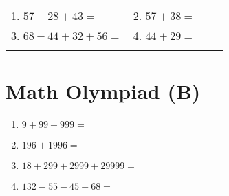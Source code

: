 \documentclass[a4paper,12pt]{article}
\begin{document}
\noindent
\begin{tabularx}{\textwidth}{lX lX}
    \vspace{8cm}
    1. \textbf{\Large $57 + 28 + 43 =$} \underline{\hspace{2cm}} \hspace{3.1cm} & 2. \textbf{\Large $57 + 38 =$} \underline{\hspace{2cm}} \\ 
    \vspace{8cm}
    3. \textbf{\Large $68 + 44 + 32 + 56 =$} \underline{\hspace{2cm}} & 4. \textbf{\Large $44 + 29 =$} \underline{\hspace{2cm}} \\
    \vspace{4cm}
\end{tabularx}


\newpage
\section*{\huge \center\textbf{Math Olympiad (B)}}
\vspace{1 cm}
\begin{multicols}{2}
\begin{enumerate}[label=\arabic*.]
    \item \textbf{\Large $9 + 99 + 999 =$} \underline{\hspace{1cm}} \vspace{8cm}
    \item \textbf{\Large $196 + 1996 =$} \underline{\hspace{1cm}} \vspace{8cm}
    \vfill\null
\columnbreak
    \item \textbf{\Large $18 + 299 + 2999 + 29999 =$} \underline{\hspace{1cm}} \vspace{8cm}
    \item \textbf{\Large $132 - 55 - 45 + 68 =$} \underline{\hspace{1cm}} \vspace{0.5cm}
\end{enumerate}
\end{multicols}

\newpage
\end{document}

